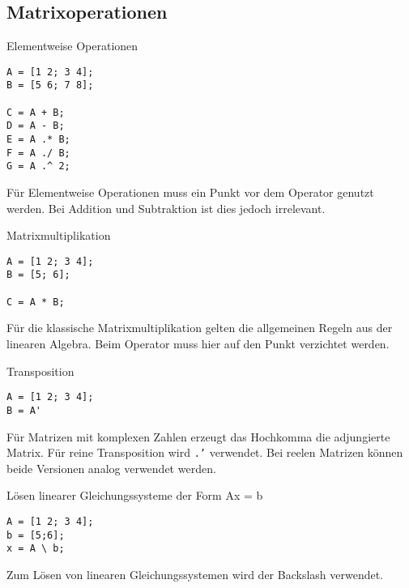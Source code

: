         \subsection{Matrixoperationen}
        \begin{CodeErklaerungBox}{Elementweise Operationen}
                \begin{lstlisting}
A = [1 2; 3 4];
B = [5 6; 7 8];

C = A + B;
D = A - B;
E = A .* B;
F = A ./ B;
G = A .^ 2;
                \end{lstlisting}
                \tcblower
                Für Elementweise Operationen muss ein Punkt vor dem Operator genutzt werden. Bei Addition und Subtraktion ist dies jedoch irrelevant.
            \end{CodeErklaerungBox}
            \begin{CodeErklaerungBox}{Matrixmultiplikation}
                \begin{lstlisting}
A = [1 2; 3 4];
B = [5; 6];

C = A * B;
                \end{lstlisting}
                \tcblower
                Für die klassische Matrixmultiplikation gelten die allgemeinen Regeln aus der linearen Algebra. Beim Operator muss hier auf den Punkt verzichtet werden.
            \end{CodeErklaerungBox}
            \begin{CodeErklaerungBox}{Transposition}
                \begin{lstlisting}
A = [1 2; 3 4];
B = A'
                \end{lstlisting}
                \tcblower
                Für Matrizen mit komplexen Zahlen erzeugt das Hochkomma die adjungierte Matrix. Für reine Transposition wird \texttt{.'} verwendet. Bei reelen Matrizen können beide Versionen analog verwendet werden.
            \end{CodeErklaerungBox}
            \begin{CodeErklaerungBox}{Lösen linearer Gleichungssysteme der Form {Ax = b}}
                \begin{lstlisting}
A = [1 2; 3 4];
b = [5;6];
x = A \ b;
                \end{lstlisting}
                \tcblower
                Zum Lösen von linearen Gleichungssystemen wird der Backslash verwendet.
            \end{CodeErklaerungBox}
